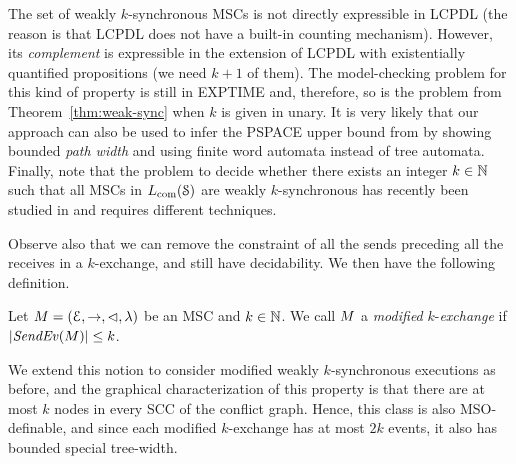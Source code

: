 \documentclass[a4paper,UKenglish,cleveref, autoref, thm-restate]{lipics-v2021}
\begin{document}
\begin{remark}
The set of weakly $k$-synchronous MSCs is not directly expressible in LCPDL
(the reason is that LCPDL does not have a built-in counting mechanism).
However, its \emph{complement} is expressible in the extension of LCPDL with
existentially quantified propositions
(we need $k+1$ of them). The model-checking problem for
this kind of property is still in EXPTIME and, therefore, so is the problem from
Theorem~\ref{thm:weak-sync} when $k$ is given in unary. It is very likely that our approach can also be used to
infer the PSPACE upper bound from \cite{DBLP:conf/cav/BouajjaniEJQ18}
by showing bounded \emph{path width} and using finite word automata instead of tree automata.
Finally, note that
the problem to decide whether there exists an integer $k \in \mathbb{N}$ such that all MSCs in $L_{\textup{com}}(\mathcal{S})$
are weakly $k$-synchronous
has recently been studied in \cite{DLL2021} and requires different techniques.
\end{remark}

	Observe also that we can remove the constraint of all the sends preceding all the receives in a $k$-exchange, and still have decidability. We then have the following definition.

\begin{definition}\label{def:mod-weak-synchr}
	Let $M = (\mathcal{E},\to,\lhd,\lambda)$ be an MSC
	and $k \in \mathbb{N}$.
	We call $M$ a \emph{modified} $k$-\emph{exchange} if $|\mathit{SendEv}(M)| \le k$.
\end{definition}

We extend this notion to consider modified weakly $k$-synchronous executions as before, and the graphical characterization of this property is that there are at most $k$ nodes in every SCC of the conflict graph. Hence, this class is also MSO-definable, and since each modified $k$-exchange has at most $2k$ events, it also has bounded special tree-width. 
\end{document}
